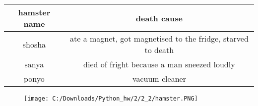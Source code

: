 \documentclass{article}
\begin{document}
\begin{tabular}{|c|c|}
\hline
hamster name & death cause \\
\hline
shosha & ate a magnet, got magnetised to the fridge, starved to death \\
\hline
sanya & died of fright because a man sneezed loudly \\
\hline
ponyo & vacuum cleaner \\
\hline
\end{tabular}
\begin{figure}[htbp]
\centering
\texttt{[image: C:/Downloads/Python\_hw/2/2\_2/hamster.PNG]}
\end{figure}
\end{document}
